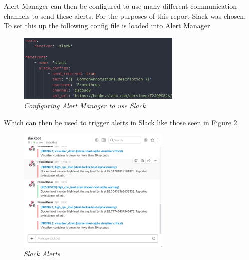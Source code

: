 Alert Manager can then be configured to use many different communication channels to send these alerts. For the purposes of this report Slack was chosen. To set this up the following config file is loaded into Alert Manager.

\begin{figure}[!h]
	\centering
	\includegraphics*[width=0.7\textwidth]{components/images/slack-config}
	\caption{\em Configuring Alert Manager to use Slack}
	\label{fig:slack-config}
\end{figure}

Which can then be used to trigger alerts in Slack like those seen in Figure \ref{fig:slack}.

\begin{figure}[!h]
	\centering
	\includegraphics*[width=0.65\textwidth]{components/images/slack}
	\caption{\em Slack Alerts}
	\label{fig:slack}
\end{figure}
